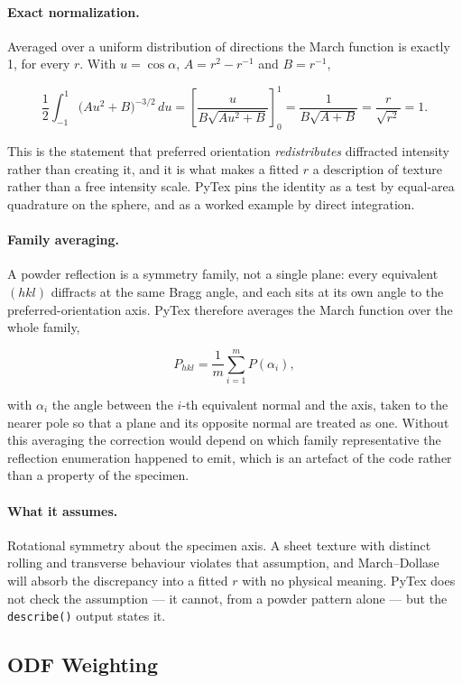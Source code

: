 \paragraph{Exact normalization.}
Averaged over a uniform distribution of directions the March function is exactly
1, for every $r$. With $u = \cos\alpha$, $A = r^{2} - r^{-1}$ and $B = r^{-1}$,

\[
  \frac{1}{2}\int_{-1}^{1} \bigl(A u^{2} + B\bigr)^{-3/2} \, du
    = \left[ \frac{u}{B\sqrt{A u^{2} + B}} \right]_{0}^{1}
    = \frac{1}{B\sqrt{A + B}}
    = \frac{r}{\sqrt{r^{2}}}
    = 1 .
\]

This is the statement that preferred orientation \emph{redistributes} diffracted
intensity rather than creating it, and it is what makes a fitted $r$ a
description of texture rather than a free intensity scale. PyTex pins the
identity as a test by equal-area quadrature on the sphere, and as a worked
example by direct integration.

\paragraph{Family averaging.}
A powder reflection is a symmetry family, not a single plane: every equivalent
$(hkl)$ diffracts at the same Bragg angle, and each sits at its own angle to the
preferred-orientation axis. PyTex therefore averages the March function over the
whole family,

\[
  P_{hkl} = \frac{1}{m}\sum_{i=1}^{m} P(\alpha_i),
\]

with $\alpha_i$ the angle between the $i$-th equivalent normal and the axis,
taken to the nearer pole so that a plane and its opposite normal are treated as
one. Without this averaging the correction would depend on which family
representative the reflection enumeration happened to emit, which is an artefact
of the code rather than a property of the specimen.

\paragraph{What it assumes.}
Rotational symmetry about the specimen axis. A sheet texture with distinct
rolling and transverse behaviour violates that assumption, and March--Dollase
will absorb the discrepancy into a fitted $r$ with no physical meaning. PyTex
does not check the assumption --- it cannot, from a powder pattern alone --- but
the \texttt{describe()} output states it.

\subsection{ODF Weighting}

